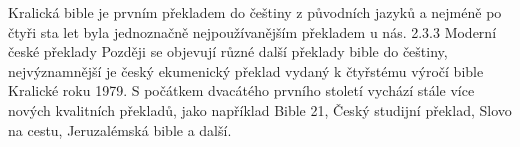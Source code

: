 \documentclass[letterpaper,12pt,oneside]{article}
\begin{document}
\begin{itemize}
Kralická bible je prvním překladem do češtiny z původních jazyků a nejméně po čtyři sta let byla jednoznačně nejpoužívanějším překladem u nás.
2.3.3	Moderní české překlady
Později se objevují různé další překlady bible do češtiny, nejvýznamnější je český ekumenický překlad vydaný k čtyřstému výročí bible Kralické roku 1979. S počátkem dvacátého prvního století vychází stále více nových kvalitních překladů, jako například Bible 21, Český studijní překlad, Slovo na cestu, Jeruzalémská bible a další.
\end{itemize}

\printbibliography[heading=bibintoc]
\end{document}
